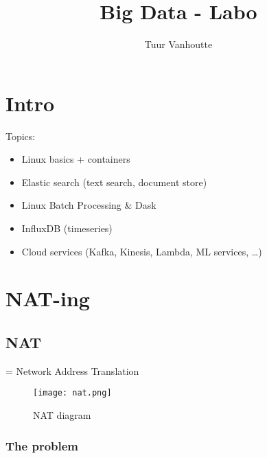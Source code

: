 \documentclass{article}
\begin{document}
\begin{titlepage}
    \author{Tuur Vanhoutte}
    \title{Big Data - Labo}
\end{titlepage}

\maketitle
\newpage
\tableofcontents
\newpage


\section{Intro}

Topics:

\begin{itemize}
    \item Linux basics + containers
    \item Elastic search (text search, document store)
    \item Linux Batch Processing \& Dask
    \item InfluxDB (timeseries)
    \item Cloud services (Kafka, Kinesis, Lambda, ML services, \dots)
\end{itemize}

\section{NAT-ing}

\subsection{NAT}

= Network Address Translation

\begin{figure}[H]
    \centering
    \texttt{[image: nat.png]}
    \caption{NAT diagram}
\end{figure}

\subsubsection{The problem}
\end{document}
